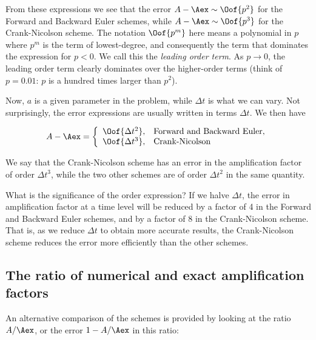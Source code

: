 \documentclass[graybox,sectrefs,envcountresetchap,open=right,final]{svmonodo}
\begin{document}
From these expressions we see that the error $A-\Aex\sim \Oof{p^2}$
for the Forward and Backward Euler schemes, while
$A-\Aex\sim \Oof{p^3}$ for the Crank-Nicolson scheme.
The notation $\Oof{p^m}$ here means a polynomial in $p$ where
$p^m$ is the term of lowest-degree, and consequently the term that
dominates the expression for $p < 0$. We call this the
\emph{leading order term}. As $p\rightarrow 0$, the leading order term
clearly dominates over the higher-order terms (think of $p=0.01$:
$p$ is a hundred times larger than $p^2$).

Now, $a$ is a given parameter in the problem, while $\Delta t$ is
what we can vary. Not surprisingly, the error expressions are usually
written in terms $\Delta t$. We then have

\begin{equation}
A-\Aex = \left\lbrace\begin{array}{ll}
\Oof{\Delta t^2}, & \hbox{Forward and Backward Euler},\\ 
\Oof{\Delta t^3}, & \hbox{Crank-Nicolson}
\end{array}\right.
\end{equation}

We say that the Crank-Nicolson scheme has an error in the amplification
factor of order $\Delta t^3$, while the two other schemes are
of order $\Delta t^2$ in the same quantity.

What is the significance of the order expression? If we halve $\Delta t$,
the error in amplification factor at a time level will be reduced
by a factor of 4 in the Forward and Backward Euler schemes, and by
a factor of 8 in the Crank-Nicolson scheme. That is, as we
reduce $\Delta t$ to obtain more accurate results, the Crank-Nicolson
scheme reduces the error more efficiently than the other schemes.

\subsection{The ratio of numerical and exact amplification factors}


An alternative comparison of the schemes is provided by looking at the
ratio $A/\Aex$, or the error $1-A/\Aex$ in this ratio:
\end{document}
